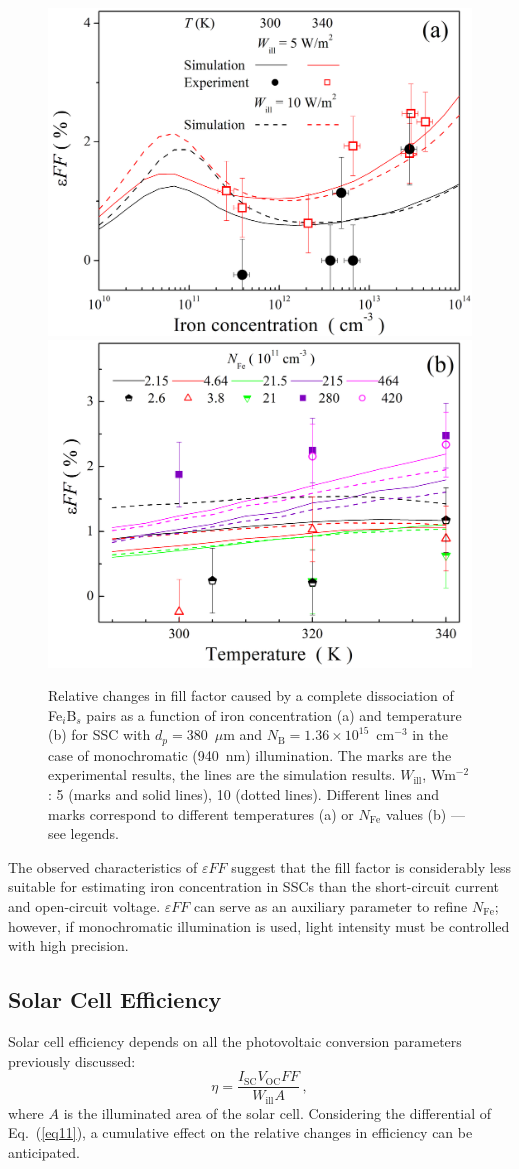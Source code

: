 \documentclass[a4paper,fleqn]{cas-sc}
\begin{document}
\begin{figure}
	\centering
     \includegraphics[width=0.4\linewidth]{Fig9a.png}
     \includegraphics[width=0.4\linewidth]{Fig9b.png}
	  \caption{Relative changes in fill factor caused by a complete
       dissociation of Fe$_i$B$_s$ pairs as a function of iron concentration (a) and
       temperature (b) for SSC with $d_p=380$~$\mu$m and $N_\mathrm{B}=1.36\times10^{15}$~cm$^{-3}$
       in the case of monochromatic (940~nm) illumination.
       The marks are the experimental results, the lines are the simulation results.
       $W_\mathrm{ill}$, Wm$^{-2}$: 5 (marks and solid lines), 10 (dotted lines).
       Different lines and marks correspond to different temperatures (a) or $N_\mathrm{Fe}$ values (b) --- see legends.
}\label{fig9}
\end{figure}

The observed characteristics of $\varepsilon FF$ suggest that
the fill factor is considerably less suitable for estimating iron concentration in SSCs
than the short-circuit current and open-circuit voltage.
$\varepsilon FF$ can serve as an auxiliary parameter to refine $N_\mathrm{Fe}$;
however, if monochromatic illumination is used, light intensity must be controlled with high precision.



\subsection{Solar Cell Efficiency}

Solar cell efficiency depends on all the photovoltaic conversion parameters previously discussed:
\begin{equation}
\label{eq11}
    \eta = \frac{I_\mathrm{SC}V_\mathrm{OC}FF}{W_\mathrm{ill}A}\,,
\end{equation}
where
$A$ is the illuminated area of the solar cell.
Considering the differential of Eq.~(\ref{eq11}), a cumulative effect on the relative changes in efficiency can be anticipated.
\end{document}
